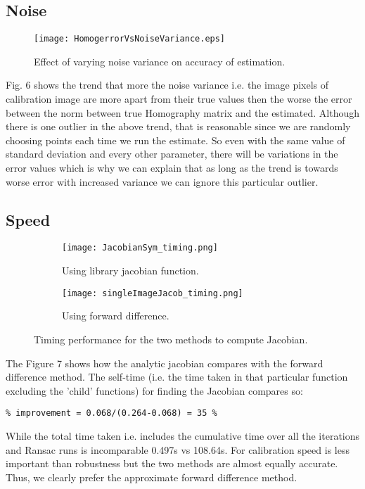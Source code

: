\documentclass[titlepage]{article}
\begin{document}
\subsection{Noise}
\begin{wrapfigure}{r}{5.5cm}
\texttt{[image: HomogerrorVsNoiseVariance.eps]}
\caption{Effect of varying noise variance on accuracy of estimation.}
\end{wrapfigure} 
Fig. 6 shows the trend that more the noise variance i.e. the image pixels of calibration image are more apart from their true values then the worse the error between the norm between true Homography matrix and the estimated. Although there is one outlier in the above trend, that is reasonable since we are randomly choosing points each time we run the estimate. So even with the same value of standard deviation and every other parameter, there will be variations in the error values which is why we can explain that as long as the trend is towards worse error with increased variance we can ignore this particular outlier.
\subsection{Speed}
\begin{figure}[H]
\begin{subfigure}{0.5\textwidth}
\label{Correspond}
\texttt{[image: JacobianSym\_timing.png]}
\caption{Using library jacobian function.}
\end{subfigure}
\begin{subfigure}{0.5\textwidth}
\label{Consensus}
\texttt{[image: singleImageJacob\_timing.png]}
\caption{Using forward difference.}
\end{subfigure}
\caption{Timing performance for the two methods to compute Jacobian.}
\end{figure}
The Figure 7 shows how the analytic jacobian compares with the forward difference method. The self-time (i.e. the time taken in that particular function excluding the 'child' functions) for finding the Jacobian compares so:
\begin{verbatim}
% improvement = 0.068/(0.264-0.068) = 35 %
\end{verbatim}
While the total time taken i.e. includes the cumulative time over all the iterations and Ransac runs is incomparable 0.497s vs 108.64s. For calibration speed is less important than robustness but the two methods are almost equally accurate. Thus, we clearly prefer the approximate forward difference method. 
\end{document}
